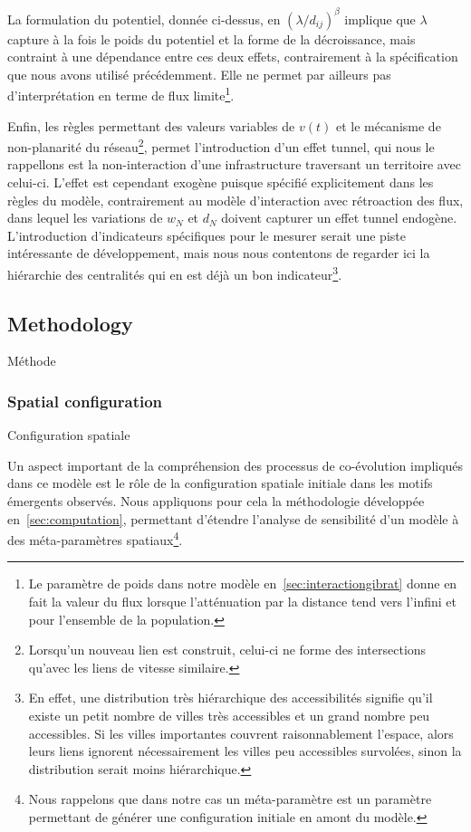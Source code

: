 La formulation du potentiel, donnée ci-dessus, en $(\lambda / d_{ij})^\beta$ implique que $\lambda$ capture à la fois le poids du potentiel et la forme de la décroissance, mais contraint à une dépendance entre ces deux effets, contrairement à la spécification que nous avons utilisé précédemment. Elle ne permet par ailleurs pas d'interprétation en terme de flux limite\footnote{Le paramètre de poids dans notre modèle en~\ref{sec:interactiongibrat} donne en fait la valeur du flux lorsque l'atténuation par la distance tend vers l'infini et pour l'ensemble de la population.}.

Enfin, les règles permettant des valeurs variables de $v(t)$ et le mécanisme de non-planarité du réseau\footnote{Lorsqu'un nouveau lien est construit, celui-ci ne forme des intersections qu'avec les liens de vitesse similaire.}, permet l'introduction d'un effet tunnel, qui nous le rappellons est la non-interaction d'une infrastructure traversant un territoire avec celui-ci. L'effet est cependant exogène puisque spécifié explicitement dans les règles du modèle, contrairement au modèle d'interaction avec rétroaction des flux, dans lequel les variations de $w_N$ et $d_N$ doivent capturer un effet tunnel endogène. L'introduction d'indicateurs spécifiques pour le mesurer serait une piste intéressante de développement, mais nous nous contentons de regarder ici la hiérarchie des centralités qui en est déjà un bon indicateur\footnote{En effet, une distribution très hiérarchique des accessibilités signifie qu'il existe un petit nombre de villes très accessibles et un grand nombre peu accessibles. Si les villes importantes couvrent raisonnablement l'espace, alors leurs liens ignorent nécessairement les villes peu accessibles survolées, sinon la distribution serait moins hiérarchique.}.



\subsection{Methodology}{Méthode}

\subsubsection{Spatial configuration}{Configuration spatiale}

Un aspect important de la compréhension des processus de co-évolution impliqués dans ce modèle est le rôle de la configuration spatiale initiale dans les motifs émergents observés. Nous appliquons pour cela la méthodologie développée en~\ref{sec:computation}, permettant d'étendre l'analyse de sensibilité d'un modèle à des méta-paramètres spatiaux\footnote{Nous rappelons que dans notre cas un méta-paramètre est un paramètre permettant de générer une configuration initiale en amont du modèle.}.

